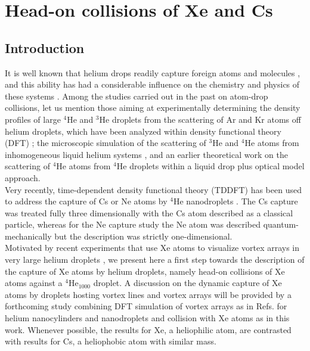 \chapter{Head-on collisions of Xe and Cs}	
	\section{Introduction}\label{introduction}
		It is well known that helium drops readily capture foreign atoms and molecules \cite{Sch90}, and this ability has had a considerable influence on the chemistry and physics of these systems \cite{Toe04}. Among the studies carried out in the past on atom-drop collisions, let us mention those aiming at experimentally determining the density profiles of large $^4$He and $^3$He droplets from the scattering of Ar and Kr atoms off  helium droplets, which have been analyzed within density functional theory  (DFT) \cite{Har98,Har01}; the microscopic simulation of the scattering of $^3$He and $^4$He atoms from inhomogeneous liquid helium systems \cite{Kro07,Kro08}, and an earlier theoretical work on the scattering of $^4$He atoms from $^4$He droplets within a liquid drop plus optical model approach\citep{Eic88}.\\

			Very recently, time-dependent density functional theory (TDDFT) has been used to address the capture of Cs or Ne atoms by $^4$He nanodroplets \cite{Lea14,Vil16}. The Cs capture was treated fully three dimensionally with the Cs atom described as a classical particle, whereas for the Ne capture study the Ne atom was described quantum-mechanically but the description was strictly one-dimensional.\\
			
			Motivated by recent experiments that use Xe atoms to visualize vortex arrays in very large helium droplets \cite{Gom14,Jon16}, we present here a first step towards the description of the capture  of Xe atoms by helium droplets, namely head-on collisions of Xe atoms against a $^4$He$_{1000}$ droplet. A discussion on the dynamic capture of Xe atoms by droplets hosting vortex lines and vortex arrays will be provided by a forthcoming study combining DFT simulation of vortex arrays as in Refs. \cite{Anc14,Anc15} for helium nanocylinders and nanodroplets  and collision with Xe atoms as in this work. Whenever possible, the results for Xe, a heliophilic atom,  are contrasted with results for Cs, a heliophobic atom with similar mass.

